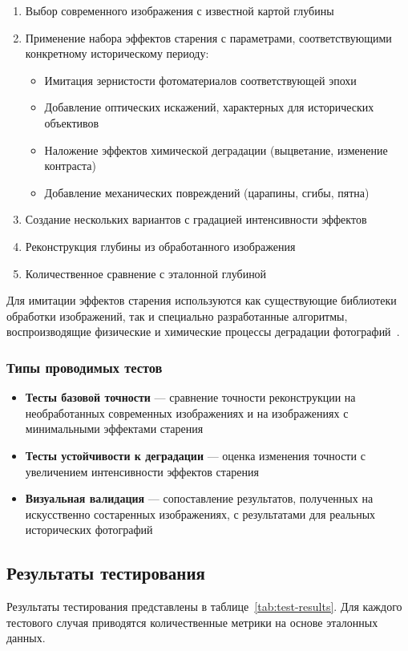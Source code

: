 \begin{enumerate}
    \item Выбор современного изображения с известной картой глубины
    \item Применение набора эффектов старения с параметрами, соответствующими конкретному историческому периоду:
    \begin{itemize}
        \item Имитация зернистости фотоматериалов соответствующей эпохи
        \item Добавление оптических искажений, характерных для исторических объективов
        \item Наложение эффектов химической деградации (выцветание, изменение контраста)
        \item Добавление механических повреждений (царапины, сгибы, пятна)
    \end{itemize}
    \item Создание нескольких вариантов с градацией интенсивности эффектов
    \item Реконструкция глубины из обработанного изображения
    \item Количественное сравнение с эталонной глубиной
\end{enumerate}

Для имитации эффектов старения используются как существующие библиотеки обработки изображений, так и специально разработанные алгоритмы, воспроизводящие физические и химические процессы деградации фотографий~\cite{zaharov2014}.

\subsubsection{Типы проводимых тестов}

\begin{itemize}
    \item \textbf{Тесты базовой точности} --- сравнение точности реконструкции на необработанных современных изображениях и на изображениях с минимальными эффектами старения

    \item \textbf{Тесты устойчивости к деградации} --- оценка изменения точности с увеличением интенсивности эффектов старения

    \item \textbf{Визуальная валидация} --- сопоставление результатов, полученных на искусственно состаренных изображениях, с результатами для реальных исторических фотографий
\end{itemize}

\subsection{Результаты тестирования}

Результаты тестирования представлены в таблице~\ref{tab:test-results}. Для каждого тестового случая приводятся количественные метрики на основе эталонных данных.

\section{}



